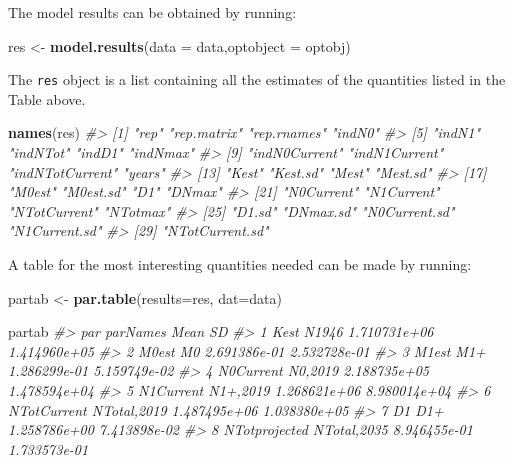 \documentclass[
]{article}
\newenvironment{Shaded}{\begin{snugshade}}{\end{snugshade}}
\newcommand{\CommentTok}[1]{\textcolor[rgb]{0.56,0.35,0.01}{\textit{#1}}}
\newcommand{\DataTypeTok}[1]{\textcolor[rgb]{0.13,0.29,0.53}{#1}}
\newcommand{\KeywordTok}[1]{\textcolor[rgb]{0.13,0.29,0.53}{\textbf{#1}}}
\newcommand{\NormalTok}[1]{#1}
\newcommand{\StringTok}[1]{\textcolor[rgb]{0.31,0.60,0.02}{#1}}
\begin{document}
The model results can be obtained by running:

\begin{Shaded}
\begin{Highlighting}[]
\NormalTok{res <-}\StringTok{ }\KeywordTok{model.results}\NormalTok{(}\DataTypeTok{data =}\NormalTok{ data,}\DataTypeTok{optobject =}\NormalTok{ optobj)}
\end{Highlighting}
\end{Shaded}

The \texttt{res} object is a list containing all the estimates of the
quantities listed in the Table above.

\begin{Shaded}
\begin{Highlighting}[]
\KeywordTok{names}\NormalTok{(res)}
\CommentTok{#>  [1] "rep"            "rep.matrix"     "rep.rnames"     "indN0"         }
\CommentTok{#>  [5] "indN1"          "indNTot"        "indD1"          "indNmax"       }
\CommentTok{#>  [9] "indN0Current"   "indN1Current"   "indNTotCurrent" "years"         }
\CommentTok{#> [13] "Kest"           "Kest.sd"        "Mest"           "Mest.sd"       }
\CommentTok{#> [17] "M0est"          "M0est.sd"       "D1"             "DNmax"         }
\CommentTok{#> [21] "N0Current"      "N1Current"      "NTotCurrent"    "NTotmax"       }
\CommentTok{#> [25] "D1.sd"          "DNmax.sd"       "N0Current.sd"   "N1Current.sd"  }
\CommentTok{#> [29] "NTotCurrent.sd"}
\end{Highlighting}
\end{Shaded}

A table for the most interesting quantities needed can be made by
running:

\begin{Shaded}
\begin{Highlighting}[]
\NormalTok{partab <-}\StringTok{ }\KeywordTok{par.table}\NormalTok{(}\DataTypeTok{results=}\NormalTok{res, }\DataTypeTok{dat=}\NormalTok{data) }

\NormalTok{partab }
\CommentTok{#>             par    parNames         Mean           SD}
\CommentTok{#> 1          Kest       N1946 1.710731e+06 1.414960e+05}
\CommentTok{#> 2         M0est          M0 2.691386e-01 2.532728e-01}
\CommentTok{#> 3         M1est         M1+ 1.286299e-01 5.159749e-02}
\CommentTok{#> 4     N0Current     N0,2019 2.188735e+05 1.478594e+04}
\CommentTok{#> 5     N1Current    N1+,2019 1.268621e+06 8.980014e+04}
\CommentTok{#> 6   NTotCurrent NTotal,2019 1.487495e+06 1.038380e+05}
\CommentTok{#> 7            D1         D1+ 1.258786e+00 7.413898e-02}
\CommentTok{#> 8 NTotprojected NTotal,2035 8.946455e-01 1.733573e-01}
\end{Highlighting}
\end{Shaded}
\end{document}
